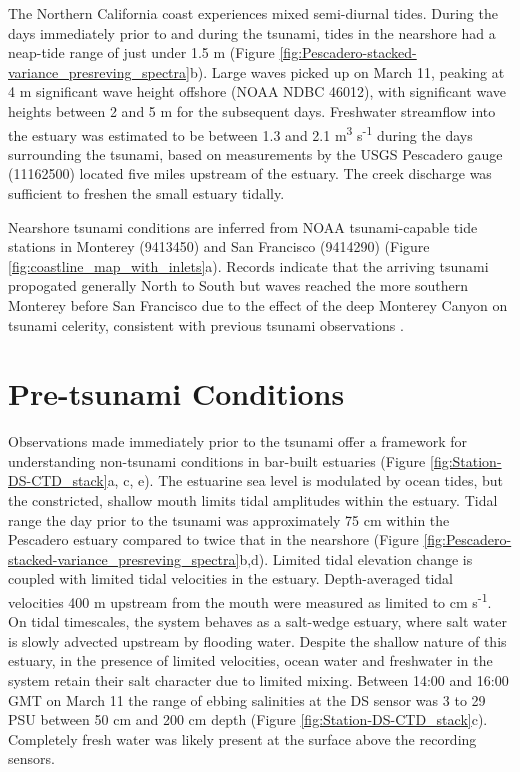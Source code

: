 The Northern California coast experiences mixed semi-diurnal tides.
During the days immediately prior to and during the tsunami, tides
in the nearshore had a neap-tide range of just under 1.5 m
(Figure \ref{fig:Pescadero-stacked-variance_presreving_spectra}b).
Large waves picked up on March 11, peaking at 4 m significant wave
height offshore (NOAA NDBC 46012), with significant wave heights between
2 and 5 m for the subsequent days. Freshwater streamflow into
the estuary was estimated to be between 1.3 and 2.1 m\textsuperscript{3}
s\textsuperscript{-1} during the days surrounding the tsunami, based on measurements by the USGS Pescadero
gauge (11162500) located five miles upstream of the estuary. The creek discharge was sufficient to freshen the small estuary tidally. 

Nearshore tsunami conditions are inferred from NOAA tsunami-capable
tide stations in Monterey (9413450) and San Francisco (9414290) (Figure
\ref{fig:coastline_map_with_inlets}a). Records indicate that the
arriving tsunami propogated generally North to South but waves reached
the more southern Monterey before San Francisco due to the effect
of the deep Monterey Canyon on tsunami celerity, consistent with previous
tsunami observations \parencite{gonzalez_edge_1995}. 


\section{Pre-tsunami Conditions}

Observations made immediately prior to the tsunami offer a framework
for understanding non-tsunami conditions in bar-built estuaries (Figure
\ref{fig:Station-DS-CTD_stack}a, c, e). The estuarine sea level is
modulated by ocean tides, but the constricted, shallow mouth limits
tidal amplitudes within the estuary. Tidal range the day prior to
the tsunami was approximately 75 cm within the Pescadero estuary compared
to twice that in the nearshore (Figure \ref{fig:Pescadero-stacked-variance_presreving_spectra}b,d).
Limited tidal elevation change is coupled with limited tidal velocities
in the estuary. Depth-averaged tidal velocities 400 m upstream from
the mouth were measured as limited to  cm s\textsuperscript{-1}.
On tidal timescales, the system behaves as a salt-wedge estuary, where
salt water is slowly advected upstream by flooding water. Despite
the shallow nature of this estuary, in the presence of limited velocities,
ocean water and freshwater in the system retain their salt character
due to limited mixing. Between 14:00 and 16:00 GMT on March 11 the
range of ebbing salinities at the DS sensor was 3 to 29 PSU between
50 cm and 200 cm depth (Figure \ref{fig:Station-DS-CTD_stack}c).
Completely fresh water was likely present at the surface above the
recording sensors. 


